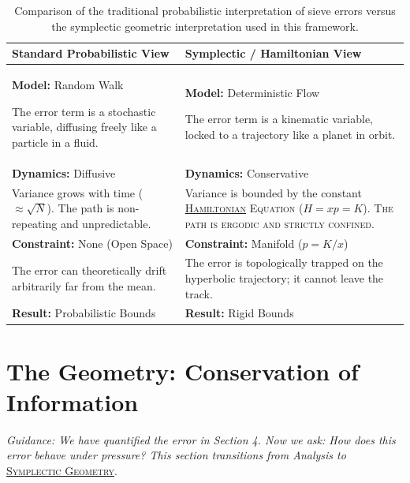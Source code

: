 \documentclass[sn-mathphys-num, pdflatex, referee]{sn-jnl}
\newcommand{\gterm}[2]{\begingroup\normalfont\scshape\hyperlink{#1}{#2}\endgroup}
\begin{document}
\begin{table}[ht]
\centering
\renewcommand{\arraystretch}{1.5}
\begin{tabular}{|>{\raggedright\arraybackslash}p{}|>{\raggedright\arraybackslash}p{}|}
\hline
\hline
\textbf{Standard Probabilistic View} & \textbf{Symplectic / Hamiltonian View} \\ \hline
\raggedright
\textbf{Model:} Random Walk \par \vspace{0.4em}
The error term is a stochastic variable, diffusing freely like a particle in a fluid. &
\textbf{Model:} Deterministic Flow \par \vspace{0.4em}
\raggedright\arraybackslash The error term is a kinematic variable, locked to a trajectory like a planet in orbit.
\\ \hline 
\textbf{Dynamics:} Diffusive & \textbf{Dynamics:} Conservative \\
Variance grows with time ($ \approx \sqrt{N} $). The path is non-repeating and unpredictable. & Variance is bounded by the constant \gterm{hamiltonian}{Hamiltonian} Equation ($H=xp=K$). The path is ergodic and strictly confined. \\ \hline
\textbf{Constraint:} None (Open Space) & \textbf{Constraint:} Manifold ($p = K/x$) \\
The error can theoretically drift arbitrarily far from the mean. & The error is topologically trapped on the hyperbolic trajectory; it cannot leave the track. \\ \hline
\textbf{Result:} Probabilistic Bounds & \textbf{Result:} Rigid Bounds \\
\hline
\end{tabular}
\caption{Comparison of the traditional probabilistic interpretation of sieve errors versus the symplectic geometric interpretation used in this framework.}
\end{table}

\section{The Geometry: Conservation of Information}
\label{sec:geom}

\textit{Guidance: We have quantified the error in Section 4. Now we ask: How does this error behave under pressure? This section transitions from Analysis to} \gterm{geometry}{Symplectic Geometry}.
\end{document}
